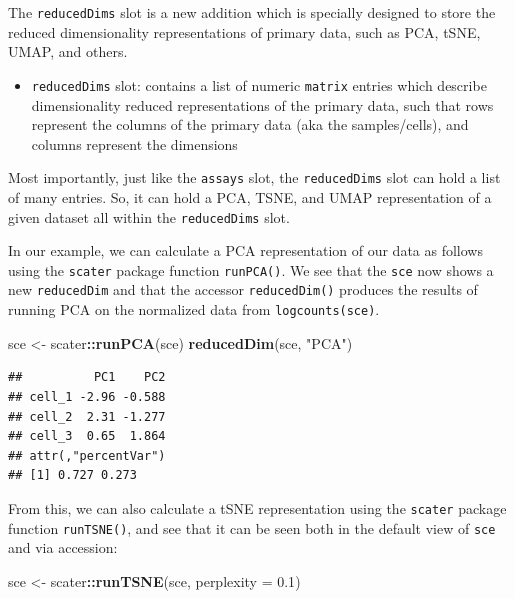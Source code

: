 \documentclass[]{book}
\newenvironment{Shaded}{\begin{snugshade}}{\end{snugshade}}
\newcommand{\DataTypeTok}[1]{\textcolor[rgb]{0.13,0.29,0.53}{#1}}
\newcommand{\FloatTok}[1]{\textcolor[rgb]{0.00,0.00,0.81}{#1}}
\newcommand{\KeywordTok}[1]{\textcolor[rgb]{0.13,0.29,0.53}{\textbf{#1}}}
\newcommand{\NormalTok}[1]{#1}
\newcommand{\OperatorTok}[1]{\textcolor[rgb]{0.81,0.36,0.00}{\textbf{#1}}}
\newcommand{\StringTok}[1]{\textcolor[rgb]{0.31,0.60,0.02}{#1}}
\providecommand{\tightlist}{%
  \setlength{\itemsep}{0pt}\setlength{\parskip}{0pt}}
\begin{document}
The \texttt{reducedDims} slot is a new addition which is specially designed to store the reduced dimensionality representations of primary data, such as PCA, tSNE, UMAP, and others.

\begin{itemize}
\tightlist
\item
  \texttt{reducedDims} slot: contains a list of numeric \texttt{matrix} entries which describe dimensionality reduced representations of the primary data, such that rows represent the columns of the primary data (aka the samples/cells), and columns represent the dimensions
\end{itemize}

Most importantly, just like the \texttt{assays} slot, the \texttt{reducedDims} slot can hold a list of many entries. So, it can hold a PCA, TSNE, and UMAP representation of a given dataset all within the \texttt{reducedDims} slot.

In our example, we can calculate a PCA representation of our data as follows using the \texttt{scater} package function \texttt{runPCA()}. We see that the \texttt{sce} now shows a new \texttt{reducedDim} and that the accessor \texttt{reducedDim()} produces the results of running PCA on the normalized data from \texttt{logcounts(sce)}.

\begin{Shaded}
\begin{Highlighting}[]
\NormalTok{sce <-}\StringTok{ }\NormalTok{scater}\OperatorTok{::}\KeywordTok{runPCA}\NormalTok{(sce)}
\KeywordTok{reducedDim}\NormalTok{(sce, }\StringTok{"PCA"}\NormalTok{)}
\end{Highlighting}
\end{Shaded}

\begin{verbatim}
##          PC1    PC2
## cell_1 -2.96 -0.588
## cell_2  2.31 -1.277
## cell_3  0.65  1.864
## attr(,"percentVar")
## [1] 0.727 0.273
\end{verbatim}

From this, we can also calculate a tSNE representation using the \texttt{scater} package function \texttt{runTSNE()}, and see that it can be seen both in the default view of \texttt{sce} and via accession:

\begin{Shaded}
\begin{Highlighting}[]
\NormalTok{sce <-}\StringTok{ }\NormalTok{scater}\OperatorTok{::}\KeywordTok{runTSNE}\NormalTok{(sce, }\DataTypeTok{perplexity =} \FloatTok{0.1}\NormalTok{)}
\end{Highlighting}
\end{Shaded}
\end{document}

